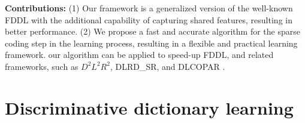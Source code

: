 \documentclass[letterpaper]{article}
\begin{document}
\par{\bf Contributions:} (1) Our framework is a generalized version of the well-known FDDL\cite{Meng2011FDDL} with the additional capability of capturing shared features, resulting in better performance. (2) We propose a fast and accurate algorithm for the sparse coding step in the learning process, resulting in a flexible and practical learning framework. our algorithm can be applied to speed-up FDDL, and related frameworks, such as $D^2L^2R^2$\cite{li2014learning}, DLRD\_SR\cite{ma2012sparse}, and DLCOPAR \cite{kong2012dictionary}.




\vspace{-0.1in}
\section{Discriminative dictionary learning}
\vspace{-0.05in}
\end{document}

